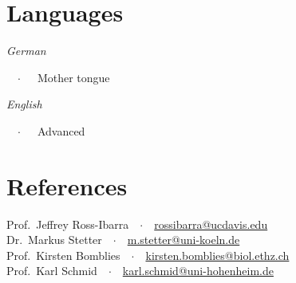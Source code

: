 \documentclass[margin,10pt,a4paper]{res}
\begin{document}
\begin{resume}
\section{Languages}
\newlength{\langbox} 
\settowidth{\langbox}{Germang}
\parbox[t]{\langbox}{\sl{German}}\ \ $\cdotp$\ \ \ Mother tongue\\
\parbox[t]{\langbox}{\sl{English}}\ \ $\cdotp$\ \ \ Advanced


\section{References}

Prof.~Jeffrey Ross-Ibarra\ \ $\cdotp$\ \ \href{mailto:rossibarra@ucdavis.edu}{rossibarra@ucdavis.edu}\\
Dr.~Markus Stetter\ \ $\cdotp$\ \ \href{mailto:m.stetter@uni-koeln.de}{m.stetter@uni-koeln.de}\\
Prof.~Kirsten Bomblies\ \ $\cdotp$\ \ \href{mailto:kirsten.bomblies@biol.ethz.ch}{kirsten.bomblies@biol.ethz.ch}\\
Prof.~Karl Schmid\ \ $\cdotp$\ \ \href{mailto:karl.schmid@uni-hohenheim.de}{karl.schmid@uni-hohenheim.de}\\



\end{resume}
\end{document}
